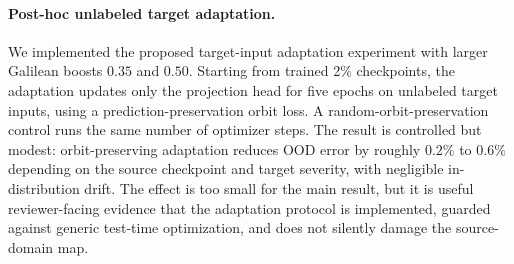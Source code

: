 \begin{table}[t]
\centering
\small
\caption{Observable analytic canonicalization at 2\% labels. The baseline reads the boost channels from each OOD input, evaluates the model at zero boost, and restores the output frame.}
\label{tab:new-observable-canonicalization}
\end{table}

\paragraph{Post-hoc unlabeled target adaptation.} We implemented the proposed target-input adaptation experiment with larger Galilean boosts \(0.35\) and \(0.50\). Starting from trained 2\% checkpoints, the adaptation updates only the projection head for five epochs on unlabeled target inputs, using a prediction-preservation orbit loss. A random-orbit-preservation control runs the same number of optimizer steps. The result is controlled but modest: orbit-preserving adaptation reduces OOD error by roughly \(0.2\%\) to \(0.6\%\) depending on the source checkpoint and target severity, with negligible in-distribution drift. The effect is too small for the main result, but it is useful reviewer-facing evidence that the adaptation protocol is implemented, guarded against generic test-time optimization, and does not silently damage the source-domain map.

